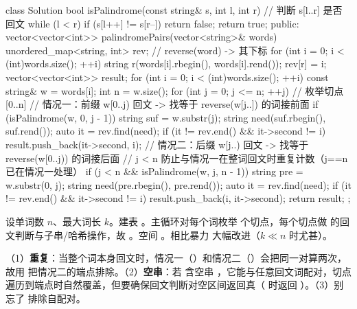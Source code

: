 \begin{cpp}
class Solution {
    bool isPalindrome(const string& s, int l, int r) { // 判断 s[l..r] 是否回文
        while (l < r) if (s[l++] != s[r--]) return false;
        return true;
    }
public:
    vector<vector<int>> palindromePairs(vector<string>& words) {
        unordered_map<string, int> rev;   // reverse(word) -> 其下标
        for (int i = 0; i < (int)words.size(); ++i) {
            string r(words[i].rbegin(), words[i].rend());
            rev[r] = i;
        }
        vector<vector<int>> result;
        for (int i = 0; i < (int)words.size(); ++i) {
            const string& w = words[i];
            int n = w.size();
            for (int j = 0; j <= n; ++j) {           // 枚举切点 [0..n]
                // 情况一：前缀 w[0..j) 回文 -> 找等于 reverse(w[j..]) 的词接前面
                if (isPalindrome(w, 0, j - 1)) {
                    string suf = w.substr(j);
                    string need(suf.rbegin(), suf.rend());
                    auto it = rev.find(need);
                    if (it != rev.end() && it->second != i)
                        result.push_back({it->second, i});
                }
                // 情况二：后缀 w[j..) 回文 -> 找等于 reverse(w[0..j)) 的词接后面
                // j < n 防止与情况一在整词回文时重复计数（j==n 已在情况一处理）
                if (j < n && isPalindrome(w, j, n - 1)) {
                    string pre = w.substr(0, j);
                    string need(pre.rbegin(), pre.rend());
                    auto it = rev.find(need);
                    if (it != rev.end() && it->second != i)
                        result.push_back({i, it->second});
                }
            }
        }
        return result;
    }
};
\end{cpp}

\begin{keypoint}[复杂度]
设单词数 $n$、最大词长 $k$。建表 。主循环对每个词枚举  个切点，每个切点做  的回文判断与子串/哈希操作，故 。空间 。相比暴力  大幅改进（$k \ll n$ 时尤甚）。
\end{keypoint}

\begin{pitfall}[重复计数与空串]
（1）\textbf{重复}：当整个词本身回文时，情况一（）和情况二（）会把同一对算两次，故用  把情况二的端点排除。（2）\textbf{空串}：若  含空串 ，它能与任意回文词配对，切点遍历到端点时自然覆盖，但要确保回文判断对空区间返回真（ 时返回 ）。（3）别忘了  排除自配对。
\end{pitfall}

